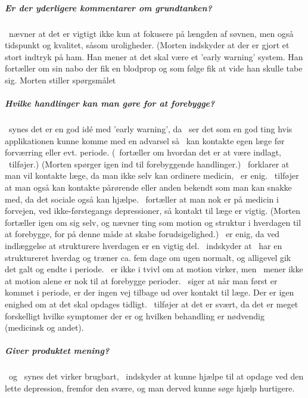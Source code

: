 \subparagraph{Er der yderligere kommentarer om grundtanken?}
\pa~nævner at det er vigtigt ikke kun at fokusere på længden af søvnen, men også tidspunkt og kvalitet, såsom uroligheder.
(Morten indskyder at der er gjort et stort indtryk på ham.
Han mener at det skal være et 'early warning' system.
Han fortæller om sin nabo der fik en blodprop og som følge fik at vide han skulle tabe sig.
Morten stiller spørgsmålet \subparagraph{Hvilke handlinger kan man gøre for at forebygge?}
\pa~synes det er en god idé med 'early warning', da \pa~ser det som en god ting hvis applikationen kunne komme med en advarsel så \pa~kan kontakte egen læge før forværring eller evt. periode.
(\pd~fortæller om hvordan det er at være indlagt, \pe~tilføjer.)
(Morten spørger igen ind til forebyggende handlinger.)
\pa~forklarer at man vil kontakte læge, da man ikke selv kan ordinere medicin, \pe~er enig.
\pa~tilføjer at man også kan kontakte pårørende eller anden bekendt som man kan snakke med, da det sociale også kan hjælpe.
\pe~fortæller at man nok er på medicin i forvejen, ved ikke-førstegangs depressioner, så kontakt til læge er vigtig.
(Morten fortæller igen om sig selv, og nævner ting som motion og struktur i hverdagen til at forebygge, for på denne måde at skabe forudsigelighed.)
\pe~er enig, da ved indlæggelse at strukturere hverdagen er en vigtig del.
\pa~indskyder at \pa~har en struktureret hverdag og træner ca. fem dage om ugen normalt, og alligevel gik det galt og endte i periode.
\pa~er ikke i tvivl om at motion virker, men \pe~mener ikke at motion alene er nok til at forebygge perioder.
\pc~siger at når man først er kommet i periode, er der ingen vej tilbage ud over kontakt til læge.
Der er igen enighed om at det skal opdages tidligt.
\pa~tilføjer at det er svært, da det er meget forskelligt hvilke symptomer der er og hvilken behandling er nødvendig (medicinsk og andet).

\subparagraph{Giver produktet mening?}
\pa~og \pe~synes det virker brugbart, \pc~indskyder at kunne hjælpe til at opdage ved den lette depression, fremfor den svære, og man derved kunne søge hjælp hurtigere.

